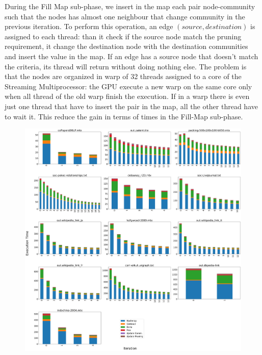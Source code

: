 During the Fill Map sub-phase, we insert in the map each pair node-community such that the nodes has almost one neighbour that change community in the previous iteration.
To perform this operation, an edge $(source, destination)$ is assigned to each thread: than it check if the source node match the pruning requirement, it change the destination node with the destination communities and insert the value in the map. If an edge has a source node that doesn't match the criteria, its thread will return without doing nothing else. The problem is that the nodes are organized in warp of 32 threads assigned to a core of the Streaming Multiprocessor: the GPU execute a new warp on the same core only when all thread of the old warp finish the execution. If in a warp there is even just one thread that have to insert the pair in the map, all the other thread have to wait it. This reduce the gain in terms of times in the Fill-Map sub-phase.
\begin{figure}[t!]
	\centering
	\includegraphics[width=1\linewidth]{0-resources/suphases-hash}
	\caption{}
	\label{fig:suphases-hash}
\end{figure}


